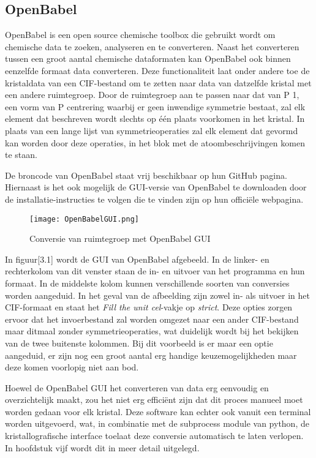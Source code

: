 \subsection{OpenBabel}
OpenBabel is een open source chemische toolbox die gebruikt wordt om chemische data te zoeken, analyseren en te converteren.\citep*{OBAB1} Naast het converteren tussen een groot aantal chemische dataformaten kan OpenBabel ook binnen eenzelfde formaat data converteren. Deze functionaliteit laat onder andere toe de kristaldata van een CIF-bestand om te zetten naar data van datzelfde kristal met een andere ruimtegroep. Door de ruimtegroep aan te passen naar dat van P 1, een vorm van P centrering waarbij er geen inwendige symmetrie bestaat, zal elk element dat beschreven wordt slechts op één plaats voorkomen in het kristal. In plaats van een lange lijst van symmetrieoperaties zal elk element dat gevormd kan worden door deze operaties, in het blok met de atoombeschrijvingen komen te staan.   
\par
De broncode van OpenBabel staat vrij beschikbaar op hun GitHub pagina.  Hiernaast is het ook mogelijk de GUI-versie van OpenBabel te downloaden door de installatie-instructies te volgen die te vinden zijn op hun officiële webpagina.\citep*{OBAB1}   
\par
\begin{figure}[h]
\texttt{[image: OpenBabelGUI.png]}
\caption{Conversie van ruimtegroep met OpenBabel GUI}
\end{figure}
\par
In figuur[3.1] wordt de GUI van OpenBabel afgebeeld. In de linker- en rechterkolom van dit venster staan de in- en uitvoer van het programma en hun formaat. In de middelste kolom kunnen verschillende soorten van conversies worden aangeduid. In het geval van de afbeelding zijn zowel in- als uitvoer in het CIF-formaat en staat het \textit{Fill the unit cel}-vakje op \textit{strict}. Deze opties zorgen ervoor dat het invoerbestand zal worden omgezet naar een ander CIF-bestand maar ditmaal zonder symmetrieoperaties, wat duidelijk wordt bij het bekijken van de twee buitenste kolommen. Bij dit voorbeeld is er maar een optie aangeduid, er zijn nog een groot aantal erg handige keuzemogelijkheden maar deze komen voorlopig niet aan bod.
\par
Hoewel de OpenBabel GUI het converteren van data erg eenvoudig en overzichtelijk maakt, zou het niet erg efficiënt zijn dat dit proces manueel moet worden gedaan voor elk kristal. Deze software kan echter ook vanuit een terminal worden uitgevoerd, wat, in combinatie met de subprocess module van python, de kristallografische interface toelaat deze conversie automatisch te laten verlopen. In hoofdstuk vijf wordt dit in meer detail uitgelegd.
\par     
